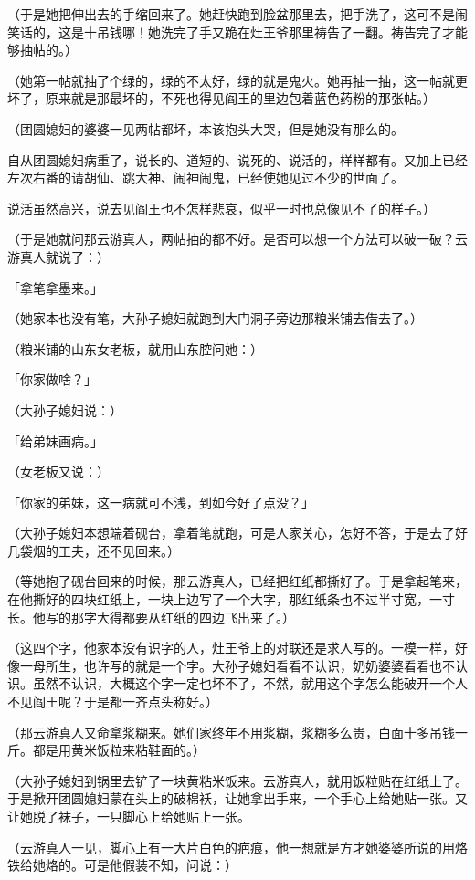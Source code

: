 \documentclass[UTF8]{ctexart}
\begin{document}
（于是她把伸出去的手缩回来了。她赶快跑到脸盆那里去，把手洗了，这可不是闹笑话的，这是十吊钱哪！她洗完了手又跪在灶王爷那里祷告了一翻。祷告完了才能够抽帖的。）

（她第一帖就抽了个绿的，绿的不太好，绿的就是鬼火。她再抽一抽，这一帖就更坏了，原来就是那最坏的，不死也得见阎王的里边包着蓝色药粉的那张帖。）

（团圆媳妇的婆婆一见两帖都坏，本该抱头大哭，但是她没有那么的。

自从团圆媳妇病重了，说长的、道短的、说死的、说活的，样样都有。又加上已经左次右番的请胡仙、跳大神、闹神闹鬼，已经使她见过不少的世面了。

说活虽然高兴，说去见阎王也不怎样悲哀，似乎一时也总像见不了的样子。）

（于是她就问那云游真人，两帖抽的都不好。是否可以想一个方法可以破一破？云游真人就说了：）

「拿笔拿墨来。」

（她家本也没有笔，大孙子媳妇就跑到大门洞子旁边那粮米铺去借去了。）

（粮米铺的山东女老板，就用山东腔问她：）

「你家做啥？」

（大孙子媳妇说：）

「给弟妹画病。」

（女老板又说：）

「你家的弟妹，这一病就可不浅，到如今好了点没？」

（大孙子媳妇本想端着砚台，拿着笔就跑，可是人家关心，怎好不答，于是去了好几袋烟的工夫，还不见回来。）

（等她抱了砚台回来的时候，那云游真人，已经把红纸都撕好了。于是拿起笔来，在他撕好的四块红纸上，一块上边写了一个大字，那红纸条也不过半寸宽，一寸长。他写的那字大得都要从红纸的四边飞出来了。）

（这四个字，他家本没有识字的人，灶王爷上的对联还是求人写的。一模一样，好像一母所生，也许写的就是一个字。大孙子媳妇看看不认识，奶奶婆婆看看也不认识。虽然不认识，大概这个字一定也坏不了，不然，就用这个字怎么能破开一个人不见阎王呢？于是都一齐点头称好。）

（那云游真人又命拿浆糊来。她们家终年不用浆糊，浆糊多么贵，白面十多吊钱一斤。都是用黄米饭粒来粘鞋面的。）

（大孙子媳妇到锅里去铲了一块黄粘米饭来。云游真人，就用饭粒贴在红纸上了。于是掀开团圆媳妇蒙在头上的破棉袄，让她拿出手来，一个手心上给她贴一张。又让她脱了袜子，一只脚心上给她贴上一张。

（云游真人一见，脚心上有一大片白色的疤痕，他一想就是方才她婆婆所说的用烙铁给她烙的。可是他假装不知，问说：）
\end{document}
